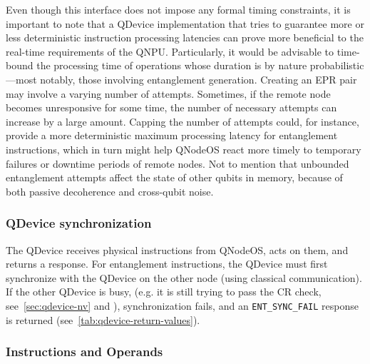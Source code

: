 Even though this interface does not impose any formal timing constraints, it is important to note that a \ac{QDevice} implementation that tries to guarantee more or less deterministic instruction processing latencies can prove more beneficial to the real-time requirements of the \ac{QNPU}. Particularly, it would be advisable to time-bound the processing time of operations whose duration is by nature probabilistic---most notably, those involving entanglement generation. Creating an \ac{EPR} pair may involve a varying number of attempts. Sometimes, if the remote node becomes unresponsive for some time, the number of necessary attempts can increase by a large amount. Capping the number of attempts could, for instance, provide a more deterministic maximum processing latency for entanglement instructions, which in turn might help \ac{QNodeOS} react more timely to temporary failures or downtime periods of remote nodes. Not to mention that unbounded entanglement attempts affect the state of other qubits in memory, because of both passive decoherence and cross-qubit noise.

\subsubsection{QDevice synchronization}
\label{sec:qdevice-sync}
The QDevice receives physical instructions from QNodeOS, acts on them, and returns a response. For entanglement instructions, the QDevice must first synchronize with the QDevice on the other node (using classical communication). If the other QDevice is busy, (e.g. it is still trying to pass the CR check, see~\cref{sec:qdevice-nv} and \cite{pompili_2022_experimental}), synchronization fails, and an \texttt{ENT\_SYNC\_FAIL} response is returned (see~\cref{tab:qdevice-return-values}).

\subsubsection{Instructions and Operands}
\label{sec:sec:appendix-qdevice-instructions-operands}

